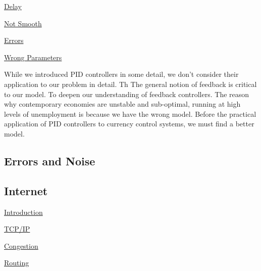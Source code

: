 \underline{Delay}

\underline{Not Smooth}

\underline{Errors}


\underline{Wrong Parameters}

While we introduced PID controllers in some detail, we don't consider their application to our
problem in detail. Th The general notion of feedback is critical to our model. To deepen our
understanding of feedback controllers. The reason why contemporary economies are unstable and
sub-optimal, running at high levels of unemployment is because we have the wrong model. Before the
practical application of PID controllers to currency control systems, we must find a better model. 

\subsection{Errors and Noise}

\subsection{Internet}


\underline{Introduction}

\underline{TCP/IP}

\underline{Congestion}

\underline{Routing}

